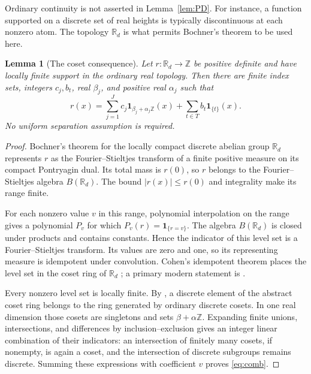 \documentclass[11pt]{article}
\newtheorem{lemma}[theorem]{Lemma}
\theoremstyle{definition}
\theoremstyle{remark}
\newcommand{\R}{\mathbb R}
\newcommand{\Z}{\mathbb Z}
\newcommand{\one}{\mathbf 1}
\numberwithin{equation}{section}
\begin{document}
Ordinary continuity is not asserted in Lemma~\ref{lem:PD}. For instance, a function supported on a discrete set of real heights is typically discontinuous at each nonzero atom. The topology $\R_d$ is what permits Bochner's theorem to be used here.

\begin{lemma}[The coset consequence]\label{lem:cosets}
Let $r:\R_d\to\Z$ be positive definite and have locally finite support in the ordinary real topology. Then there are finite index sets, integers $c_j,b_t$, real $\beta_j$, and positive real $\alpha_j$ such that
\begin{equation}\label{eq:comb}
r(x)=\sum_{j=1}^Jc_j\one_{\beta_j+\alpha_j\Z}(x)
+\sum_{t\in T}b_t\one_{\{t\}}(x).
\end{equation}
No uniform separation assumption is required.
\end{lemma}

\begin{proof}
Bochner's theorem for the locally compact discrete abelian group $\R_d$ represents $r$ as the Fourier--Stieltjes transform of a finite positive measure on its compact Pontryagin dual. Its total mass is $r(0)$, so $r$ belongs to the Fourier--Stieltjes algebra $B(\R_d)$. The bound $|r(x)|\le r(0)$ and integrality make its range finite.

For each nonzero value $v$ in this range, polynomial interpolation on the range gives a polynomial $P_v$ for which $P_v(r)=\one_{\{r=v\}}$. The algebra $B(\R_d)$ is closed under products and contains constants. Hence the indicator of this level set is a Fourier--Stieltjes transform. Its values are zero and one, so its representing measure is idempotent under convolution. Cohen's idempotent theorem places the level set in the coset ring of $\R_d$ \citep{cohen}; a primary modern statement is \citet[Theorem 1.1]{greensanders}.

Every nonzero level set is locally finite. By \citet[Theorem 3, Section 3.2]{kolountzakis}, a discrete element of the abstract coset ring belongs to the ring generated by ordinary discrete cosets. In one real dimension those cosets are singletons and sets $\beta+\alpha\Z$. Expanding finite unions, intersections, and differences by inclusion--exclusion gives an integer linear combination of their indicators: an intersection of finitely many cosets, if nonempty, is again a coset, and the intersection of discrete subgroups remains discrete. Summing these expressions with coefficient $v$ proves \eqref{eq:comb}.
\end{proof}
\end{document}
